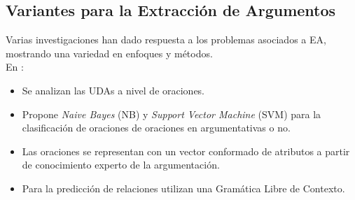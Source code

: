 \documentclass[a4paper,11pt,twocolumn,twoside]{article}
\begin{document}




\subsection{Variantes para la Extracción de Argumentos} %

Varias investigaciones han dado respuesta a los problemas asociados a EA, mostrando
una variedad en enfoques y métodos.\\

En \cite{palau2009argumentation}:

\begin{itemize}
	\item Se analizan las UDAs a nivel de oraciones.
	\item Propone \textit{Naive Bayes} (NB) y \textit{Support Vector Machine} (SVM) para la clasificación
	de oraciones de oraciones en argumentativas o no.
	\item Las oraciones se representan con un vector conformado de atributos a partir de conocimiento experto
	de la argumentación.
	\item Para la predicción de relaciones utilizan una Gramática Libre de Contexto. 
\end{itemize}
\end{document}
